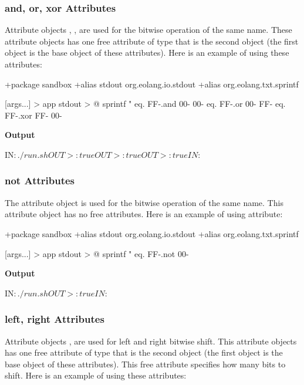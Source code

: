 \documentclass[12pt]{book}
\begin{document}
{\subsubsection{and, or, xor Attributes}
Attribute objects , ,  are used for the bitwise operation of the same name. These attribute objects has one free attribute of type  that is the second object (the first object is the base object of these attributes). Here is an example of using these attributes:
\begin{ffcode}
+package sandbox
+alias stdout org.eolang.io.stdout
+alias org.eolang.txt.sprintf

[args...] > app
  stdout > @
    sprintf
      "%
      eq.
        FF-.and 00-
        00-
      eq.
        FF-.or 00-
        FF-
      eq.
        FF-.xor FF-
        00-
\end{ffcode}
\textbf{Output}
\begin{ffcode}
IN$: ./run.sh
OUT>: true
OUT>: true
OUT>: true
IN$: 
\end{ffcode}

\subsubsection{not Attributes}
The  attribute object is used for the bitwise operation of the same name. This attribute object has no free attributes. Here is an example of using  attribute:
\begin{ffcode}
+package sandbox
+alias stdout org.eolang.io.stdout
+alias org.eolang.txt.sprintf
    
[args...] > app
  stdout > @
    sprintf
      "%
      eq.
        FF-.not
        00-
\end{ffcode}
\textbf{Output}
\begin{ffcode}
IN$: ./run.sh
OUT>: true
IN$: 
\end{ffcode}

\subsubsection{left, right Attributes}
Attribute objects ,  are used for left and right bitwise shift. This attribute objects has one free attribute of type  that is the second object (the first object is the base object of these attributes). This free attribute specifies how many bits to shift. Here is an example of using these attributes:

}
\end{document}
